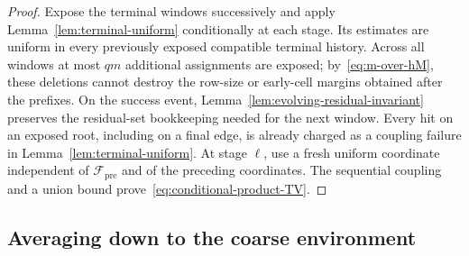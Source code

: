 \documentclass[11pt]{article}
\newcommand{\1}{\mathbf 1}
\newcommand{\cF}{\mathcal F}
\theoremstyle{definition}
\theoremstyle{remark}
\begin{document}
\begin{proof}
Expose the terminal windows successively and apply
Lemma~\ref{lem:terminal-uniform} conditionally at each stage.  Its
estimates are uniform in every previously exposed compatible terminal
history.  Across all windows at most $qm$ additional assignments are
exposed; by~\eqref{eq:m-over-hM}, these deletions cannot destroy the
row-size or early-cell margins obtained after the prefixes.  On the
success event, Lemma~\ref{lem:evolving-residual-invariant} preserves the
residual-set bookkeeping needed for the next window.  Every hit on an
exposed root, including on a final edge, is already charged as a
coupling failure in Lemma~\ref{lem:terminal-uniform}.  At stage $\ell$,
use a fresh uniform coordinate independent of
$\cF_{\mathrm{pre}}$ and of the preceding coordinates.  The sequential
coupling and a union bound prove~\eqref{eq:conditional-product-TV}.
\end{proof}

\subsection{Averaging down to the coarse environment}
\end{document}
